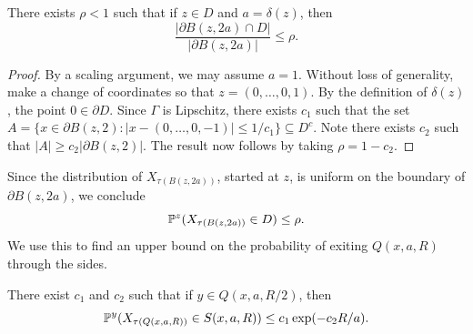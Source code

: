 \begin{lemma}\label{lem:ch3_1.4}
There exists $\rho < 1$ such that if $z \in D$ and $a = \delta(z)$, then
\[
   \frac{|\partial B(z,2a) \cap D|}{|\partial B(z,2a)|} \leq \rho.
\]
\end{lemma}

\begin{proof}
By a scaling argument, we may assume $a = 1$. Without loss of generality, make a change of coordinates so that $z = (0,\ldots,0,1)$. By the definition of $\delta(z)$, the point $0 \in \partial D$. Since $\Gamma$ is Lipschitz, there exists $c_1$ such that the set $A = \{x \in \partial B(z,2) : |x-(0,\ldots,0,-1)| \leq 1/c_1\} \subseteq D^c$. Note there exists $c_2$ such that $|A| \geq c_2|\partial B(z,2)|$. The result now follows by taking $\rho = 1-c_2$.
\end{proof}

Since the distribution of $X_{\tau(B(z,2a))}$, started at $z$, is uniform on the boundary of $\partial B(z,2a)$, we conclude
\begin{equation}\label{eq:ch3_1.11}
    \P^z(X_{\tau(B(z,2a))} \in D) \leq \rho.
\end{equation}
We use this to find an upper bound on the probability of exiting $Q(x,a,R)$ through the sides.

\begin{lemma}\label{lem:ch3_1.5}
There exist $c_1$ and $c_2$ such that if $y \in Q(x,a,R/2)$, then
\[
    \P^y(X_{\tau(Q(x,a,R))} \in S(x,a,R)) \leq c_1\exp(-c_2R/a).
\]
\end{lemma}

